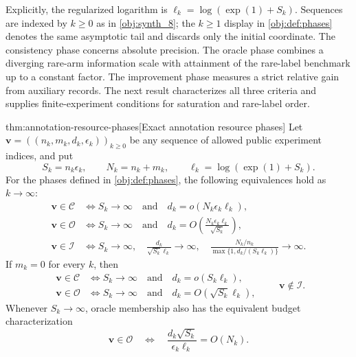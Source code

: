 \documentclass[11pt]{article}
\begin{document}
Explicitly, the regularized logarithm is \(\ell_k=\log(\exp(1)+S_k)\). Sequences are indexed by \(k\ge0\) as in \cref{obj:synth_8}; the \(k\ge1\) display in \cref{obj:def:phases} denotes the same asymptotic tail and discards only the initial coordinate. The consistency phase  concerns absolute precision. The oracle phase  combines a diverging rare-arm information scale with attainment of the rare-label benchmark up to a constant factor. The improvement phase  measures a strict relative gain from auxiliary records. The next result characterizes all three criteria and supplies finite-experiment conditions for saturation and rare-label order.

\begin{theoremv}{thm:annotation-resource-phases}[Exact annotation resource phases]
Let \(\mathbf v=((n_k,m_k,d_k,\epsilon_k))_{k\ge0}\) be any sequence of allowed public experiment indices, and put
\[
S_k=n_k\epsilon_k,\qquad
N_k=n_k+m_k,\qquad
\ell_k=\log(\exp(1)+S_k).
\]
For the phases defined in \cref{obj:def:phases}, the following equivalences hold as \(k\to\infty\):
\[
\begin{aligned}
\mathbf v\in\mathcal C
&\Longleftrightarrow
S_k\longrightarrow\infty
\quad\text{and}\quad
d_k=o(N_k\epsilon_k\ell_k),\\
\mathbf v\in\mathcal O
&\Longleftrightarrow
S_k\longrightarrow\infty
\quad\text{and}\quad
d_k=O\!\left(\frac{N_k\epsilon_k\ell_k}{\sqrt{S_k}}\right),\\
\mathbf v\in\mathcal I
&\Longleftrightarrow
S_k\longrightarrow\infty,\quad
\frac{d_k}{\sqrt{S_k}\ell_k}\longrightarrow\infty,\quad
\frac{N_k/n_k}{\max\{1,d_k/(S_k\ell_k)\}}\longrightarrow\infty.
\end{aligned}
\]
If \(m_k=0\) for every \(k\), then
\[
\begin{aligned}
\mathbf v\in\mathcal C
&\Longleftrightarrow
S_k\longrightarrow\infty
\quad\text{and}\quad d_k=o(S_k\ell_k),\\
\mathbf v\in\mathcal O
&\Longleftrightarrow
S_k\longrightarrow\infty
\quad\text{and}\quad d_k=O(\sqrt{S_k}\ell_k),
\end{aligned}
\qquad
\mathbf v\notin\mathcal I.
\]
Whenever \(S_k\to\infty\), oracle membership also has the equivalent budget characterization
\[
\mathbf v\in\mathcal O
\quad\Longleftrightarrow\quad
\frac{d_k\sqrt{S_k}}{\epsilon_k\ell_k}=O(N_k).
\]


\end{theoremv}
\end{document}
